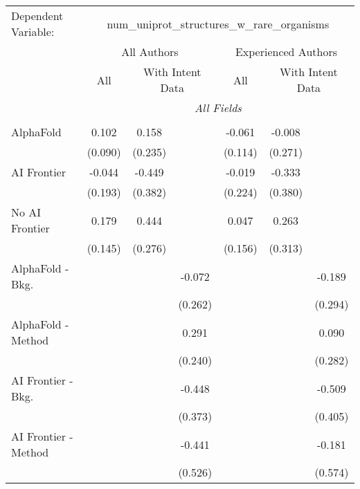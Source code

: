 \begingroup
\centering
\begin{tabular}{lcccccc}
   \tabularnewline \midrule \midrule
   Dependent Variable: & \multicolumn{6}{c}{num\_uniprot\_structures\_w\_rare\_organisms}\\
 & \multicolumn{3}{c}{All Authors} & \multicolumn{3}{c}{Experienced Authors} \\
\cmidrule(lr){2-4} \cmidrule(lr){5-7}
 & \multicolumn{1}{c}{All} & \multicolumn{2}{c}{With Intent Data} & \multicolumn{1}{c}{All} & \multicolumn{2}{c}{With Intent Data} \\
\cmidrule(lr){2-2} \cmidrule(lr){3-4} \cmidrule(lr){5-5} \cmidrule(lr){6-7}
 & \multicolumn{6}{c}{\textit{All Fields}} \\ \\
   AlphaFold               & 0.102   & 0.158   &         & -0.061  & -0.008  &   \\   
                           & (0.090) & (0.235) &         & (0.114) & (0.271) &   \\   
   AI Frontier             & -0.044  & -0.449  &         & -0.019  & -0.333  &   \\   
                           & (0.193) & (0.382) &         & (0.224) & (0.380) &   \\   
   No AI Frontier          & 0.179   & 0.444   &         & 0.047   & 0.263   &   \\   
                           & (0.145) & (0.276) &         & (0.156) & (0.313) &   \\   
   AlphaFold - Bkg.        &         &         & -0.072  &         &         & -0.189\\   
                           &         &         & (0.262) &         &         & (0.294)\\   
   AlphaFold - Method      &         &         & 0.291   &         &         & 0.090\\   
                           &         &         & (0.240) &         &         & (0.282)\\   
   AI Frontier - Bkg.      &         &         & -0.448  &         &         & -0.509\\   
                           &         &         & (0.373) &         &         & (0.405)\\   
   AI Frontier - Method    &         &         & -0.441  &         &         & -0.181\\   
                           &         &         & (0.526) &         &         & (0.574)\\   

\end{tabular}
